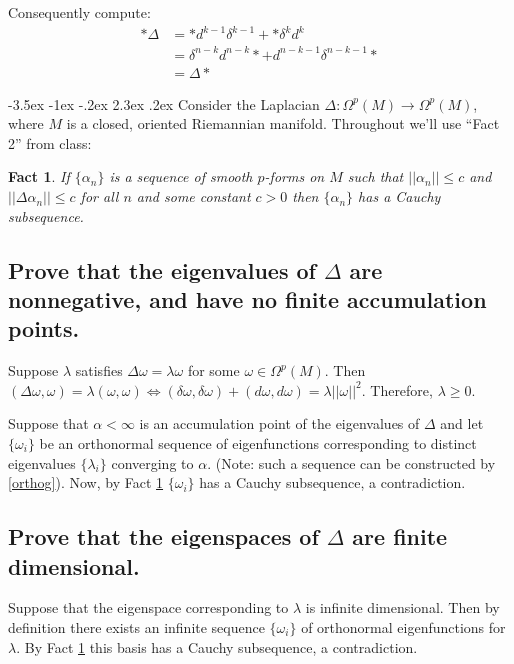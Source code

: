 \documentclass[10pt]{article}
\makeatletter
\renewcommand\section{\@startsection{section}{1}{\z@}%
                                  {-3.5ex \@plus -1ex \@minus -.2ex}%
                                  {2.3ex \@plus.2ex}%
                                  {\normalfont\large\bfseries}}
\DeclareMathOperator{\2}{II}
\newtheorem{fact}{Fact}
\makeatother
\begin{document}
Consequently compute:
\begin{align*}
    * \Delta &= *d^{k-1} \delta^{k-1} + * \delta^k d^k\\
    &= \delta^{n-k}d^{n-k}* + d^{n-k-1}\delta^{n-k-1} * \\
    &= \Delta *
\end{align*}

\section{Consider the Laplacian $\Delta: \Omega^p(M) \to \Omega^p(M)$, where $M$ is a closed, oriented Riemannian manifold.}
Throughout we'll use  ``Fact 2'' from class:
\begin{fact} \label{fact2}
If $\{ \alpha_n \}$ is a sequence of smooth $p$-forms on $M$ such that $||\alpha_n || \leq c$ and $||\Delta \alpha_n || \leq c$ for all $n$ and some constant $c > 0 $ then $\{ \alpha_n \}$ has a Cauchy subsequence.
\end{fact}


\subsection{Prove that the eigenvalues of $\Delta$ are nonnegative, and have no finite accumulation points.}
Suppose $\lambda$ satisfies $\Delta \omega = \lambda \omega$ for some $\omega \in \Omega^p(M)$. Then $(\Delta \omega, \omega) = \lambda(\omega, \omega) \iff (\delta \omega, \delta \omega) + (d \omega, d \omega) = \lambda ||\omega||^2$. Therefore, $\lambda \geq 0$.

Suppose that $\alpha < \infty$ is an accumulation point of the eigenvalues of $\Delta$ and let $\{ \omega_i \}$ be an orthonormal sequence of eigenfunctions corresponding to distinct eigenvalues $\{\lambda_i\}$ converging to $\alpha$. (Note: such a sequence can be constructed by \ref{orthog}). Now, by Fact \ref{fact2} $\{\omega_i \}$ has a Cauchy subsequence, a contradiction.

\subsection{Prove that the eigenspaces of $\Delta$ are finite dimensional.}
Suppose that the eigenspace corresponding to $\lambda$ is infinite dimensional. Then by definition there exists an infinite sequence $\{ \omega_i \}$ of orthonormal eigenfunctions for $\lambda$. By Fact \ref{fact2} this basis has a Cauchy subsequence, a contradiction.
\end{document}
